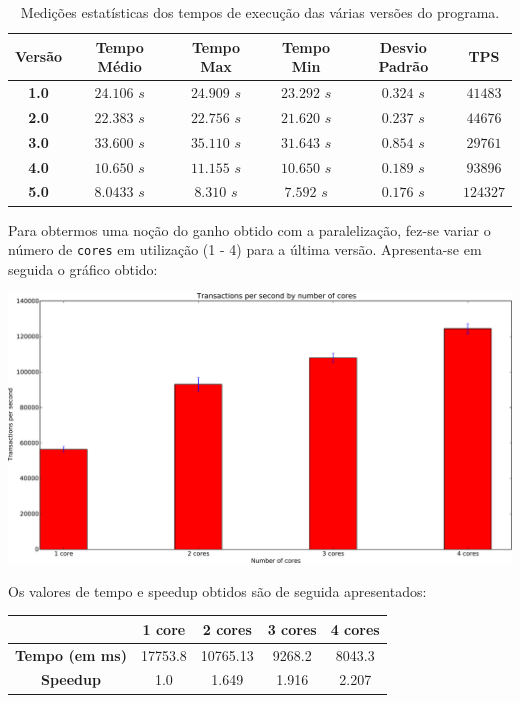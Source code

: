 \documentclass[a4paper]{article}
\begin{document}
\begin{table}[H]
	\begin{tabular}{| c | c | c | c | c | c |} \hline
		\textbf{Versão}	&	\textbf{Tempo Médio}	&	\textbf{Tempo Max}	&	\textbf{Tempo Min}	&	\textbf{Desvio Padrão}	&	\textbf{TPS}		\\	\hline
		\textbf{1.0}	&		$24.106$ $s$		&		$24.909$ $s$		&		$23.292$ $s$		&		$0.324$ $s$			&	$41483$		\\	\hline
		\textbf{2.0}	&		$22.383$ $s$		&		$22.756$ $s$		&		$21.620$ $s$		&		$0.237$ $s$			&	$44676$		\\	\hline
		\textbf{3.0}	&		$33.600$ $s$		&		$35.110$ $s$		&		$31.643$ $s$		&		$0.854$ $s$			&	$29761$		\\	\hline
		\textbf{4.0}	&		$10.650$ $s$		&		$11.155$ $s$		&		$10.650$ $s$		&		$0.189$ $s$			&	$93896$		\\	\hline
		\textbf{5.0}	&		$8.0433$ $s$		&		$8.310$ $s$			&		$7.592$ $s$			&		$0.176$ $s$			&	$124327$	\\	\hline
	\end{tabular}
	\caption{Medições estatísticas dos tempos de execução das várias versões do programa.}
\end{table}

Para obtermos uma noção do ganho obtido com a paralelização, fez-se variar o número de \texttt{cores} em utilização (1 - 4) para a última versão. Apresenta-se em seguida o gráfico obtido:

\begin{center}
	\includegraphics[scale=0.38]{v5-tps-by-cores.pdf}
	\label{fig:v5-tps-by-cores}
\end{center}

Os valores de tempo e speedup obtidos são de seguida apresentados:
\begin{center}
	\begin{tabular}{| c | c | c | c | c |}
		\hline
		 & \textbf{1 core} & \textbf{2 cores} & \textbf{3 cores} & \textbf{4 cores} \\ \hline
		\textbf{Tempo (em ms)} & 17753.8 & 10765.13 & 9268.2 & 8043.3 \\ \hline
		\textbf{Speedup} & 1.0 & 1.649 & 1.916 & 2.207 \\ \hline
	\end{tabular}
	\label{tab:speedup}
\end{center}
\end{document}
